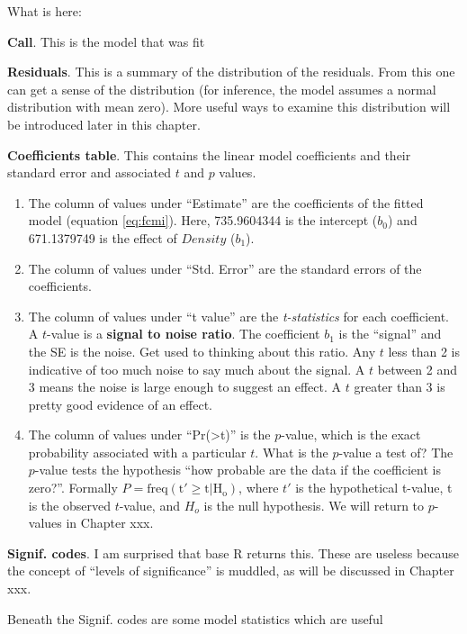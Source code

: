 \documentclass[]{book}
\providecommand{\tightlist}{%
  \setlength{\itemsep}{0pt}\setlength{\parskip}{0pt}}
\begin{document}
What is here:

\textbf{Call}. This is the model that was fit

\textbf{Residuals}. This is a summary of the distribution of the
residuals. From this one can get a sense of the distribution (for
inference, the model assumes a normal distribution with mean zero). More
useful ways to examine this distribution will be introduced later in
this chapter.

\textbf{Coefficients table}. This contains the linear model coefficients
and their standard error and associated \(t\) and \(p\) values.

\begin{enumerate}
\def\labelenumi{\arabic{enumi}.}
\tightlist
\item
  The column of values under ``Estimate'' are the coefficients of the
  fitted model (equation \eqref{eq:fcmi}). Here, 735.9604344 is the
  intercept (\(b_0\)) and 671.1379749 is the effect of \(Density\)
  (\(b_1\)).
\item
  The column of values under ``Std. Error'' are the standard errors of
  the coefficients.
\item
  The column of values under ``t value'' are the \emph{t-statistics} for
  each coefficient. A \(t\)-value is a \textbf{signal to noise ratio}.
  The coefficient \(b_1\) is the ``signal'' and the SE is the noise. Get
  used to thinking about this ratio. Any \(t\) less than 2 is indicative
  of too much noise to say much about the signal. A \(t\) between 2 and
  3 means the noise is large enough to suggest an effect. A \(t\)
  greater than 3 is pretty good evidence of an effect.
\item
  The column of values under ``Pr(\textgreater{}\textbar{}t\textbar{})''
  is the \(p\)-value, which is the exact probability associated with a
  particular \(t\). What is the \(p\)-value a test of? The \(p\)-value
  tests the hypothesis ``how probable are the data if the coefficient is
  zero?''. Formally \(P = \mathrm{freq(t' \ge t|H_o)}\), where \(t'\) is
  the hypothetical t-value, t is the observed \(t\)-value, and \(H_o\)
  is the null hypothesis. We will return to \(p\)-values in Chapter xxx.
\end{enumerate}

\textbf{Signif. codes}. I am surprised that base R returns this. These
are useless because the concept of ``levels of significance'' is
muddled, as will be discussed in Chapter xxx.

Beneath the Signif. codes are some model statistics which are useful
\end{document}
